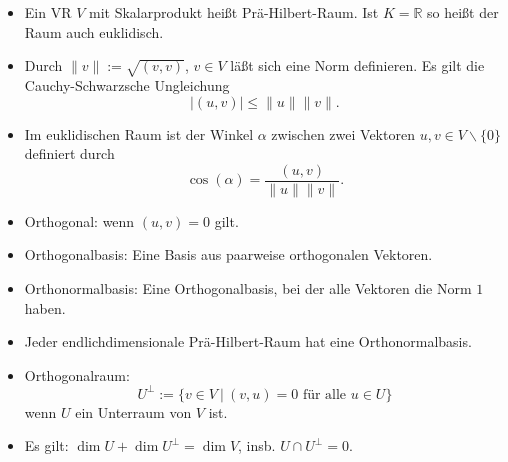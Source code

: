 \documentclass[a4paper,12pt,DIV15]{scrartcl}
\begin{document}
\begin{itemize}
\item Ein VR $V$ mit Skalarprodukt heißt {\color{red} Prä-Hilbert-Raum}. Ist
$K=\mathbb{R}$ so heißt der Raum auch {\color{red} euklidisch}.
\item Durch $\|v\|:=\sqrt{(v,v)}$, $v \in V$ läßt sich eine Norm
definieren. Es gilt die {\color{red} Cauchy-Schwarzsche Ungleichung}
\[ |(u,v)| \leq \| u \| \|v\|. \]
\item Im euklidischen Raum ist der Winkel $\alpha$ zwischen zwei Vektoren
$u,v \in V\smallsetminus \{ 0 \}$ definiert durch
\[ \cos(\alpha) = \frac{(u,v)}{\|u\| \|v \|}. \]
   \end{itemize}


\begin{itemize}
\item {\color{red} Orthogonal}: wenn $(u,v)=0$ gilt.
\item {\color{red} Orthogonalbasis}: Eine Basis aus paarweise orthogonalen Vektoren. 
\item {\color{red} Orthonormalbasis}: Eine Orthogonalbasis, bei der alle Vektoren die Norm $1$
haben.
\item Jeder endlichdimensionale Prä-Hilbert-Raum hat eine
Orthonormalbasis. 
\item {\color{red} Orthogonalraum}:
\[
{U}^\perp := \{ v \in V \ | \ (v,u)=0 \mbox{ für alle } u \in U \}
\]
wenn $U$ ein Unterraum von $V$ ist.
\item Es gilt: $\dim U + \dim U^\perp = \dim V$, insb. $U \cap U^\perp = 0$.
\end{itemize}
\end{document}

